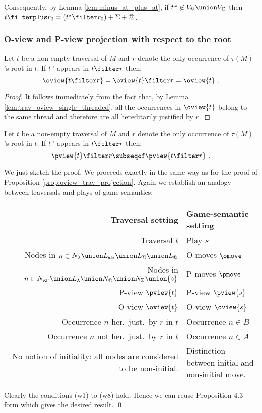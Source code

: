 Consequently, by Lemma \ref{lem:minus_at_plus_at}, if $t^\omega
\not\in V_@ \union V_\Sigma$ then $t \filterplus r_0 =
(t^\star\filter r_0) +\Sigma+@$.



\subsubsection{O-view and P-view projection with respect to the root}

\begin{lemma}
\label{lem:oviewproj_wrt_theroot}
Let $t$ be a non-empty traversal of $M$
and $r$ denote the only occurrence of $\tau(M)$'s root in $t$. If
$t^\omega$ appears in $t\filter r$ then:
$$\oview{t\filter r} = \oview{t}\filter r = \oview{t} \ .$$
\end{lemma}
\begin{proof}
It follows immediately from the fact that, by Lemma \ref{lem:trav_oview_single_threaded}, all the occurrences in $\oview{t}$ belong to the same thread and therefore are all hereditarily justified by $r$.
\end{proof}

\begin{lemma}
\label{lem:pviewproj_wrt_theroot}
Let $t$ be a non-empty traversal of $M$ and $r$ denote the only occurrence of $\tau(M)$'s
root in $t$. If $t^\omega$ appears in $t\filter r$ then:
$$ \pview{t} \filter r \subseqof \pview{t \filter r} \  .$$
\end{lemma}
\proof We just sketch the proof. We proceeds exactly in the same way
as for the proof of Proposition \ref{prop:oview_trav_projection}.
Again we establish an analogy between traversals and plays of game
semantics:
\begin{center}
\begin{tabular}{r|p{5cm}}
{\bf Traversal setting} & {\bf Game-semantic setting} \\
\hline\hline
Traversal $t$ & Play $s$ \\
Nodes in $n \in N_\lambda \union L_{\sf var} \union L_\Sigma \union L_@$ & O-moves $\omove$ \\
Nodes in $n \in N_{\sf var} \union L_\lambda \union N_@ \union N_\Sigma \union \{\diamond\}$ & P-moves $\pmove$\\
P-view $\pview{t}$  & P-view $\pview{s}$\\
O-view $\oview{t}$  & O-view $\oview{s}$\\
Occurrence $n$ her.\ just.\ by $r$ in $t$ & Occurrence $n \in B$ \\
Occurrence $n$ not her.\ just.\ by $r$ in $t$ & Occurrence $n \in A$ \\
\parbox[t]{6cm}{\raggedleft No notion of initiality: all nodes are considered to be non-initial.} & Distinction between initial and non-initial move.
\end{tabular}
\end{center}
Clearly the conditions (w1) to (w8) hold. Hence we can reuse Proposition 4.3 form \cite{hylandong_pcf} which gives the desired result. \qed
\bigskip

